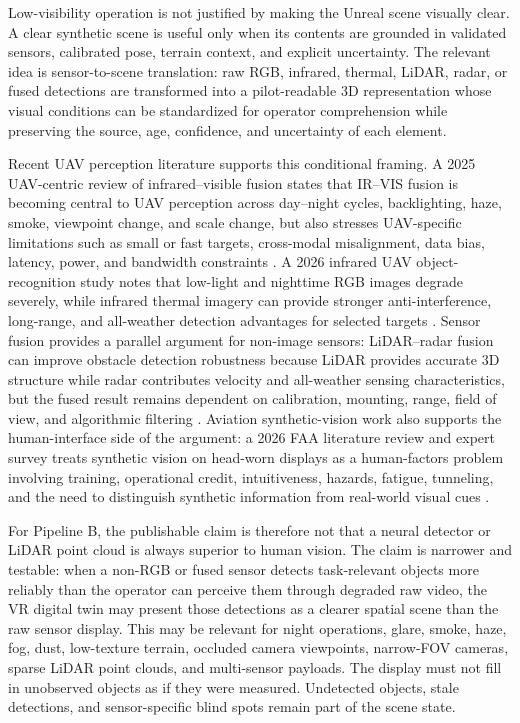 \documentclass[fleqn]{VRIH2025}
\begin{document}
Low-visibility operation is not justified by making the Unreal scene visually clear. A clear synthetic scene is useful only when its contents are grounded in validated sensors, calibrated pose, terrain context, and explicit uncertainty. The relevant idea is sensor-to-scene translation: raw RGB, infrared, thermal, LiDAR, radar, or fused detections are transformed into a pilot-readable 3D representation whose visual conditions can be standardized for operator comprehension while preserving the source, age, confidence, and uncertainty of each element.

Recent UAV perception literature supports this conditional framing. A 2025 UAV-centric review of infrared--visible fusion states that IR--VIS fusion is becoming central to UAV perception across day--night cycles, backlighting, haze, smoke, viewpoint change, and scale change, but also stresses UAV-specific limitations such as small or fast targets, cross-modal misalignment, data bias, latency, power, and bandwidth constraints \cite{li2025irvisuav}. A 2026 infrared UAV object-recognition study notes that low-light and nighttime RGB images degrade severely, while infrared thermal imagery can provide stronger anti-interference, long-range, and all-weather detection advantages for selected targets \cite{liu2026infrareduav}. Sensor fusion provides a parallel argument for non-image sensors: LiDAR--radar fusion can improve obstacle detection robustness because LiDAR provides accurate 3D structure while radar contributes velocity and all-weather sensing characteristics, but the fused result remains dependent on calibration, mounting, range, field of view, and algorithmic filtering \cite{farina2026lidarradar}. Aviation synthetic-vision work also supports the human-interface side of the argument: a 2026 FAA literature review and expert survey treats synthetic vision on head-worn displays as a human-factors problem involving training, operational credit, intuitiveness, hazards, fatigue, tunneling, and the need to distinguish synthetic information from real-world visual cues \cite{fercho2026faa_svs}.

For Pipeline B, the publishable claim is therefore not that a neural detector or LiDAR point cloud is always superior to human vision. The claim is narrower and testable: when a non-RGB or fused sensor detects task-relevant objects more reliably than the operator can perceive them through degraded raw video, the VR digital twin may present those detections as a clearer spatial scene than the raw sensor display. This may be relevant for night operations, glare, smoke, haze, fog, dust, low-texture terrain, occluded camera viewpoints, narrow-FOV cameras, sparse LiDAR point clouds, and multi-sensor payloads. The display must not fill in unobserved objects as if they were measured. Undetected objects, stale detections, and sensor-specific blind spots remain part of the scene state.
\end{document}
